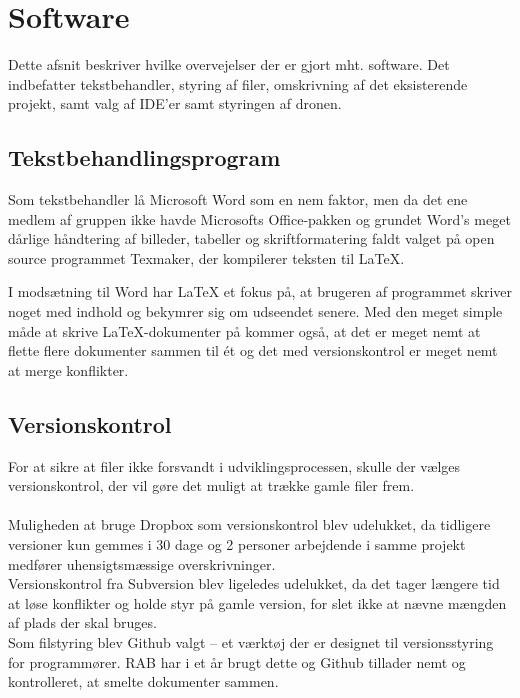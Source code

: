 \documentclass[Main]{subfiles}
\begin{document}
\chapter{Software}
Dette afsnit beskriver hvilke overvejelser der er gjort mht. software.
Det indbefatter tekstbehandler, styring af filer, omskrivning af det eksisterende projekt, samt valg af IDE'er samt styringen af dronen.


\section{Tekstbehandlingsprogram}

Som tekstbehandler lå Microsoft Word som en nem faktor, men da det ene medlem af gruppen ikke havde Microsofts Office-pakken og grundet Word's meget dårlige håndtering af billeder, tabeller og skriftformatering faldt valget på open source programmet Texmaker\cite{Texmaker}, der kompilerer teksten til LaTeX.

I modsætning til Word har LaTeX et fokus på, at brugeren af programmet skriver noget med indhold og bekymrer sig om udseendet senere. 
Med den meget simple måde at skrive LaTeX-dokumenter på kommer også, at det er meget nemt at flette flere dokumenter sammen til ét og det med versionskontrol er meget nemt at merge konflikter.



\section{Versionskontrol}
For at sikre at filer ikke forsvandt i udviklingsprocessen, skulle der vælges  versionskontrol, der vil gøre det muligt at trække gamle filer frem.
\\
\\
Muligheden at bruge Dropbox som versionskontrol blev udelukket, da tidligere versioner kun gemmes i 30 dage\cite{Dropbox} og 2 personer arbejdende i samme projekt medfører uhensigtsmæssige overskrivninger.
\\
Versionskontrol fra Subversion blev ligeledes udelukket, da det tager længere tid at løse konflikter og holde styr på gamle version, for slet ikke at nævne mængden af plads der skal bruges.
\\
Som filstyring blev Github\cite{Github-IHA} valgt -- et værktøj der er designet til versionsstyring for programmører. RAB har i et år brugt dette og Github tillader nemt og kontrolleret, at smelte dokumenter sammen.
\end{document}
